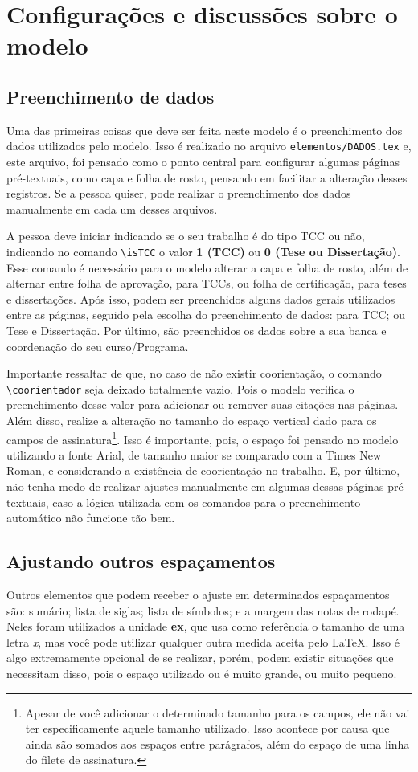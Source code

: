\chapter{Configurações e discussões sobre o modelo}\label{capitulo:configuracao}
\section{Preenchimento de dados}
Uma das primeiras coisas que deve ser feita neste modelo é o preenchimento dos dados utilizados pelo modelo. Isso é realizado no arquivo \texttt{elementos/DADOS.tex} e, este arquivo, foi pensado como o ponto central para configurar algumas páginas pré-textuais, como capa e folha de rosto, pensando em facilitar a alteração desses registros. Se a pessoa quiser, pode realizar o preenchimento dos dados manualmente em cada um desses arquivos.

A pessoa deve iniciar indicando se o seu trabalho é do tipo TCC ou não, indicando no comando \verb|\isTCC| o valor \textbf{1 (TCC)} ou \textbf{0 (Tese ou Dissertação)}. Esse comando é necessário para o modelo alterar a capa e folha de rosto, além de alternar entre folha de aprovação, para TCCs, ou folha de certificação, para teses e dissertações. Após isso, podem ser preenchidos alguns dados gerais utilizados entre as páginas, seguido pela escolha do preenchimento de dados: para TCC; ou Tese e Dissertação. Por último, são preenchidos os dados sobre a sua banca e coordenação do seu curso/Programa.

Importante ressaltar de que, no caso de não existir coorientação, o comando \verb|\coorientador| seja deixado totalmente vazio. Pois o modelo verifica o preenchimento desse valor para adicionar ou remover suas citações nas páginas. Além disso, realize a alteração no tamanho do espaço vertical dado para os campos de assinatura\footnote{Apesar de você adicionar o determinado tamanho para os campos, ele não vai ter especificamente aquele tamanho utilizado. Isso acontece por causa que ainda são somados aos espaços entre parágrafos, além do espaço de uma linha do filete de assinatura.}. Isso é importante, pois, o espaço foi pensado no modelo utilizando a fonte Arial, de tamanho maior se comparado com a Times New Roman, e considerando a existência de coorientação no trabalho. E, por último, não tenha medo de realizar ajustes manualmente em algumas dessas páginas pré-textuais, caso a lógica utilizada com os comandos para o preenchimento automático não funcione tão bem.

\section{Ajustando outros espaçamentos}
Outros elementos que podem receber o ajuste em determinados espaçamentos são: sumário; lista de siglas; lista de símbolos; e a margem das notas de rodapé. Neles foram utilizados a unidade \textbf{ex}, que usa como referência o tamanho de uma letra \textit{x}, mas você pode utilizar qualquer outra medida aceita pelo \LaTeX{}. Isso é algo extremamente opcional de se realizar, porém, podem existir situações que necessitam disso, pois o espaço utilizado ou é muito grande, ou muito pequeno.

